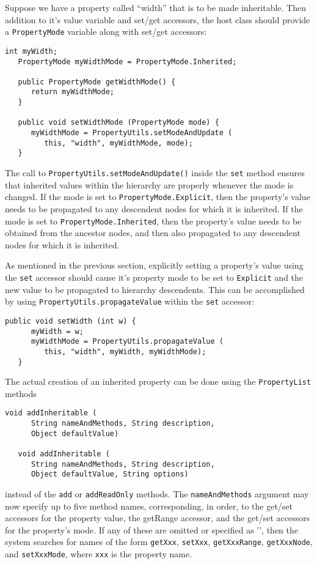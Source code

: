 Suppose we have a property called ``width'' that is to be made
inheritable.  Then addition to it's value variable and set/get
accessors, the host class should provide a {\tt PropertyMode} variable
along with set/get accessors:
\begin{lstlisting}[]
   int myWidth;
   PropertyMode myWidthMode = PropertyMode.Inherited;
   
   public PropertyMode getWidthMode() {
      return myWidthMode;
   }

   public void setWidthMode (PropertyMode mode) {
      myWidthMode = PropertyUtils.setModeAndUpdate (
         this, "width", myWidthMode, mode);
   }
\end{lstlisting}
The call to {\tt PropertyUtils.setModeAndUpdate()} inside the 
{\tt set} method ensures that inherited values within the hierarchy are
properly whenever the mode is changed. If the mode is set to 
{\tt PropertyMode.Explicit}, then the property's value needs to be
propagated to any descendent nodes for which it is inherited.  If the
mode is set to {\tt PropertyMode.Inherited}, then the property's value
needs to be obtained from the ancestor nodes, and then also propagated
to any descendent nodes for which it is inherited.

As mentioned in the previous section, explicitly setting a property's
value using the {\tt set} accessor should cause it's property mode to
be set to {\tt Explicit} and the new value to be propagated to
hierarchy descendents.  This can be accomplished by using 
{\tt PropertyUtils.propagateValue} within the {\tt set} accessor:
\begin{lstlisting}[]
   public void setWidth (int w) {
      myWidth = w;
      myWidthMode = PropertyUtils.propagateValue (
         this, "width", myWidth, myWidthMode);
   }     
\end{lstlisting}

The actual creation of an inherited property can be done using the
{\tt PropertyList} methods
\begin{lstlisting}[]
   void addInheritable (
      String nameAndMethods, String description, 
      Object defaultValue)
    
   void addInheritable (
      String nameAndMethods, String description, 
      Object defaultValue, String options)
\end{lstlisting}
instead of the {\tt add} or {\tt addReadOnly} methods. The {\tt nameAndMethods}
argument may now specify up to five method names, corresponding, in
order, to the get/set accessors for the property value, the getRange
accessor, and the get/set accessors for the property's mode.  If any
of these are omitted or specified as '{\tt *}', then the system
searches for names of the form
{\tt getXxx}, {\tt setXxx}, {\tt getXxxRange}, {\tt getXxxNode}, 
and {\tt setXxxMode}, where
{\tt xxx} is the property name.

